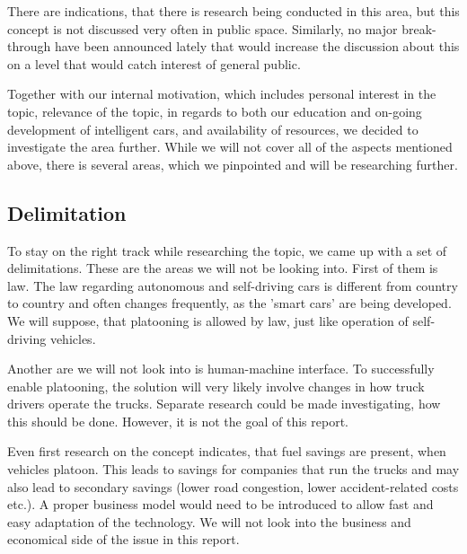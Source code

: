 % 
There are indications, that there is research being conducted in this area, but this concept is not discussed very often in public space. Similarly, no major break-through have been announced lately that would increase the discussion about this on a level that would catch interest of general public.\par
% 
Together with our internal motivation, which includes personal interest in the topic, relevance of the topic, in regards to both our education and on-going development of intelligent cars, and availability of resources, we decided to investigate the area further. While we will not cover all of the aspects mentioned above, there is several areas, which we pinpointed and will be researching further.\par
%

% 
\subsection{Delimitation}
To stay on the right track while researching the topic, we came up with a set of delimitations. These are the areas we will not be looking into. First of them is law. The law regarding autonomous and self-driving cars is different from country to country and often changes frequently, as the 'smart cars' are being developed. We will suppose, that platooning is allowed by law, just like operation of self-driving vehicles.\par
Another are we will not look into is human-machine interface. To successfully enable platooning, the solution will very likely involve changes in how truck drivers operate the trucks. Separate research could be made investigating, how this should be done. However, it is not the goal of this report.\par
Even first research on the concept indicates, that fuel savings are present, when vehicles platoon. This leads to savings for companies that run the trucks and may also lead to secondary savings (lower road congestion, lower accident-related costs etc.). A proper business model would need to be introduced to allow fast and easy adaptation of the technology. We will not look into the business and economical side of the issue in this report.
% 
